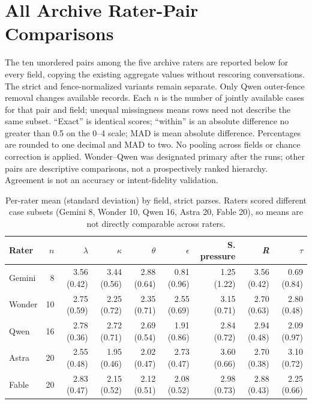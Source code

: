 \documentclass[11pt]{article}
\begin{document}
\section{All Archive Rater-Pair Comparisons}\label{app:allpairs}
The ten unordered pairs among the five archive raters are reported below for every field, copying the existing aggregate values without rescoring conversations. The strict and fence-normalized variants remain separate. Only Qwen outer-fence removal changes available records. Each $n$ is the number of jointly available cases for that pair and field; unequal missingness means rows need not describe the same subset. ``Exact'' is identical scores; ``within'' is an absolute difference no greater than 0.5 on the 0--4 scale; MAD is mean absolute difference. Percentages are rounded to one decimal and MAD to two. No pooling across fields or chance correction is applied. Wonder--Qwen was designated primary after the runs; other pairs are descriptive comparisons, not a prospectively ranked hierarchy. Agreement is not an accuracy or intent-fidelity validation.
\begin{table}[!htbp]
\centering\small
\caption{Per-rater mean (standard deviation) by field, strict parses. Raters scored different case subsets (Gemini 8, Wonder 10, Qwen 16, Astra 20, Fable 20), so means are not directly comparable across raters.}
\label{tab:raterdist}
{\setlength{\tabcolsep}{3pt}\footnotesize
\begin{tabular}{@{}lrrrrrrrr@{}}
\toprule
Rater & $n$ & $\lambda$ & $\kappa$ & $\theta$ & $\epsilon$ & S. pressure & \textit{R} & $\tau$ \\
\midrule
Gemini & 8 & 3.56 (0.42) & 3.44 (0.56) & 2.88 (0.64) & 0.81 (0.96) & 1.25 (1.22) & 3.56 (0.42) & 0.69 (0.84) \\
Wonder & 10 & 2.75 (0.59) & 2.25 (0.72) & 2.35 (0.71) & 2.55 (0.69) & 3.15 (0.71) & 2.70 (0.63) & 2.80 (0.48) \\
Qwen & 16 & 2.78 (0.36) & 2.72 (0.71) & 2.69 (0.54) & 1.91 (0.86) & 2.84 (0.72) & 2.94 (0.48) & 2.09 (0.97) \\
Astra & 20 & 2.55 (0.48) & 1.95 (0.46) & 2.02 (0.47) & 2.73 (0.47) & 3.60 (0.66) & 2.70 (0.38) & 3.10 (0.72) \\
Fable & 20 & 2.83 (0.47) & 2.15 (0.52) & 2.12 (0.51) & 2.08 (0.52) & 2.98 (0.73) & 2.88 (0.43) & 2.25 (0.66) \\
\bottomrule
\end{tabular}}
\end{table}
\end{document}
